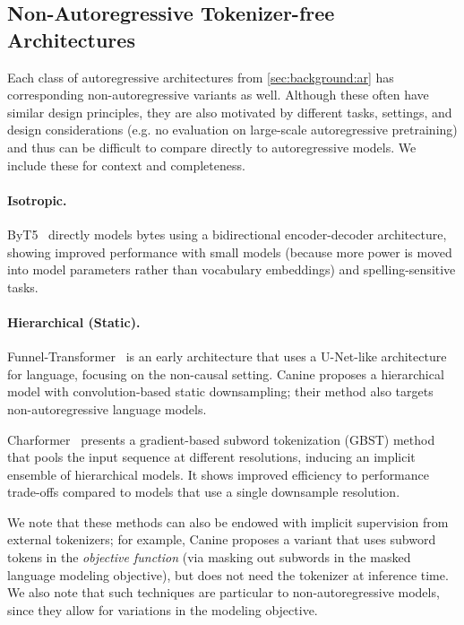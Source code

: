 \subsection{Non-Autoregressive Tokenizer-free Architectures}
\label{sec:background:nonar} 

Each class of autoregressive architectures from \cref{sec:background:ar} has corresponding non-autoregressive variants as well.
Although these often have similar design principles, they are also motivated by different tasks, settings, and design considerations (e.g. no evaluation on large-scale autoregressive pretraining) and thus can be difficult to compare directly to autoregressive models. We include these for context and completeness.

\paragraph{Isotropic.}
ByT5~\citep{ByT5} directly models bytes using a bidirectional encoder-decoder architecture, showing improved performance with small models (because more power is moved into model parameters rather than vocabulary embeddings) and spelling-sensitive tasks.

\paragraph{Hierarchical (Static).}
Funnel-Transformer~\citep{dai2020funnel} is an early architecture that uses a U-Net-like architecture for language, focusing on the non-causal setting.
Canine \citep{Canine} proposes a hierarchical model with convolution-based static downsampling; their method also targets non-autoregressive language models.

Charformer~\citep{CharFormer} presents a gradient-based subword tokenization (GBST) method that pools the input sequence at different resolutions, inducing an implicit ensemble of hierarchical models. It shows improved efficiency to performance trade-offs compared to models that use a single downsample resolution.

We note that these methods can also be endowed with implicit supervision from external tokenizers; for example, Canine proposes a variant that uses subword tokens in the \emph{objective function} (via masking out subwords in the masked language modeling objective), but does not need the tokenizer at inference time. We also note that such techniques are particular to non-autoregressive models, since they allow for variations in the modeling objective.

